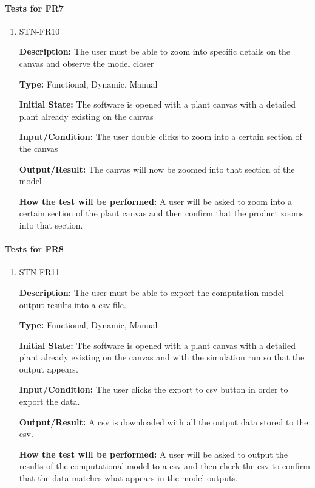 \documentclass[12pt, titlepage]{article}
\begin{document}
\paragraph{Tests for FR7}

\begin{enumerate}

\item{STN-FR10\\}

\textbf{Description:} The user must be able to zoom into specific details on the canvas and observe the model closer

\textbf{Type:} Functional, Dynamic, Manual

\textbf{Initial State:} The software is opened with a plant canvas with a detailed plant already existing on the canvas

\textbf{Input/Condition:} The user double clicks to zoom into a certain section of the canvas

\textbf{Output/Result:} The canvas will now be zoomed into that section of the model

\textbf{How the test will be performed:} A user will be asked to zoom into a certain section of the plant canvas and then confirm that the product zooms into that section.

\end{enumerate}

\paragraph{Tests for FR8}

\begin{enumerate}

\item{STN-FR11\\}

\textbf{Description:} The user must be able to export the computation model output results into a csv file.

\textbf{Type:} Functional, Dynamic, Manual

\textbf{Initial State:} The software is opened with a plant canvas with a detailed plant already existing on the canvas and with the simulation run so that the output appears.

\textbf{Input/Condition:} The user clicks the export to csv button in order to export the data.

\textbf{Output/Result:} A csv is downloaded with all the output data stored to the csv.

\textbf{How the test will be performed:} A user will be asked to output the results of the computational model to a csv and then check the csv to confirm that the data matches what appears in the model outputs.

\end{enumerate}
\end{document}
